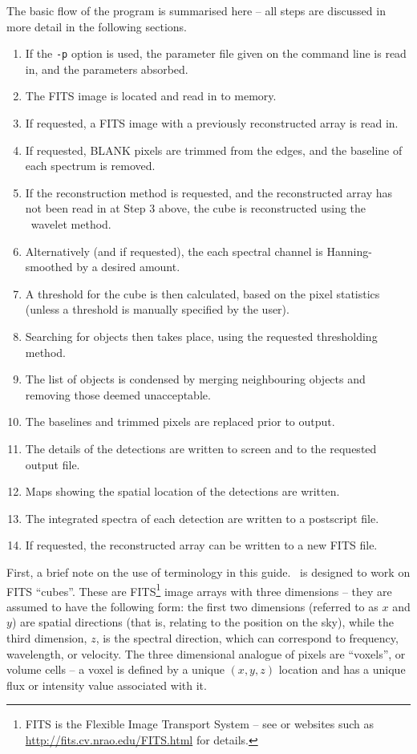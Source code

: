 The basic flow of the program is summarised here -- all steps are
discussed in more detail in the following sections.
\begin{enumerate}
\item If the \texttt{-p} option is used, the parameter file given on
  the command line is read in, and the parameters absorbed.
\item The FITS image is located and read in to memory.
\item If requested, a FITS image with a previously reconstructed array
  is read in.
\item If requested, BLANK pixels are trimmed from the edges, and
  the baseline of each spectrum is removed.
\item If the reconstruction method is requested, and the reconstructed
  array has not been read in at Step 3 above, the cube is
  reconstructed using the \atrous\ wavelet method.
\item Alternatively (and if requested), the each spectral channel is
  Hanning-smoothed by a desired amount.
\item A threshold for the cube is then calculated, based on the pixel
  statistics (unless a threshold is manually specified by the user).
\item Searching for objects then takes place, using the requested
  thresholding method.
\item The list of objects is condensed by merging neighbouring objects
  and removing those deemed unacceptable.
\item The baselines and trimmed pixels are replaced prior to output.
\item The details of the detections are written to screen and to the
  requested output file.
\item Maps showing the spatial location of the detections are written.
\item The integrated spectra of each detection are written to a
  postscript file. 
\item If requested, the reconstructed array can be written to a new
  FITS file.
\end{enumerate}


First, a brief note on the use of terminology in this guide. \duchamp\
is designed to work on FITS ``cubes''. These are FITS\footnote{FITS is
the Flexible Image Transport System -- see \citet{hanisch01} or
websites such as
\href{http://fits.cv.nrao.edu/FITS.html}{http://fits.cv.nrao.edu/FITS.html}
for details.} image arrays with three dimensions -- they are assumed
to have the following form: the first two dimensions (referred to as
$x$ and $y$) are spatial directions (that is, relating to the position
on the sky), while the third dimension, $z$, is the spectral
direction, which can correspond to frequency, wavelength, or
velocity. The three dimensional analogue of pixels are ``voxels'', or
volume cells -- a voxel is defined by a unique $(x,y,z)$ location and
has a unique flux or intensity value associated with it.

